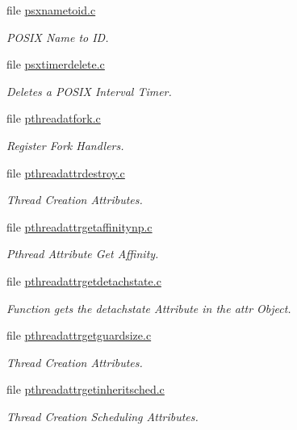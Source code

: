 \begin{DoxyCompactItemize}
file \mbox{\hyperlink{psxnametoid_8c}{psxnametoid.\+c}}
\begin{DoxyCompactList}\small\item\em P\+O\+S\+IX Name to ID. \end{DoxyCompactList}\item 
file \mbox{\hyperlink{psxtimerdelete_8c}{psxtimerdelete.\+c}}
\begin{DoxyCompactList}\small\item\em Deletes a P\+O\+S\+IX Interval Timer. \end{DoxyCompactList}\item 
file \mbox{\hyperlink{pthreadatfork_8c}{pthreadatfork.\+c}}
\begin{DoxyCompactList}\small\item\em Register Fork Handlers. \end{DoxyCompactList}\item 
file \mbox{\hyperlink{pthreadattrdestroy_8c}{pthreadattrdestroy.\+c}}
\begin{DoxyCompactList}\small\item\em Thread Creation Attributes. \end{DoxyCompactList}\item 
file \mbox{\hyperlink{pthreadattrgetaffinitynp_8c}{pthreadattrgetaffinitynp.\+c}}
\begin{DoxyCompactList}\small\item\em Pthread Attribute Get Affinity. \end{DoxyCompactList}\item 
file \mbox{\hyperlink{pthreadattrgetdetachstate_8c}{pthreadattrgetdetachstate.\+c}}
\begin{DoxyCompactList}\small\item\em Function gets the detachstate Attribute in the attr Object. \end{DoxyCompactList}\item 
file \mbox{\hyperlink{pthreadattrgetguardsize_8c}{pthreadattrgetguardsize.\+c}}
\begin{DoxyCompactList}\small\item\em Thread Creation Attributes. \end{DoxyCompactList}\item 
file \mbox{\hyperlink{pthreadattrgetinheritsched_8c}{pthreadattrgetinheritsched.\+c}}
\begin{DoxyCompactList}\small\item\em Thread Creation Scheduling Attributes. \end{DoxyCompactList}\item 

\end{DoxyCompactItemize}
